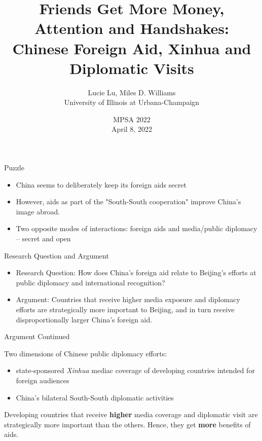 \documentclass{beamer}
\title{Friends Get More Money, Attention and Handshakes:
Chinese Foreign Aid, Xinhua and Diplomatic Visits}
\author{Lucie Lu, Miles D. Williams\\ University of Illinois at Urbana-Champaign}
\date {MPSA 2022 \\ April 8, 2022}
\begin{document}
\maketitle

\begin{frame}{Puzzle}

\begin{itemize}
    \item China seems to deliberately keep its foreign aids secret
    \item However, aids as part of the "South-South cooperation" improve China's image abroad.
    \item Two opposite modes of interactions: foreign aids and media/public diplomacy -- secret and open
\end{itemize}


    
\end{frame}

\begin{frame}{Research Question and Argument}

\begin{itemize}
    \item Research Question: How does China’s foreign aid relate to Beijing’s efforts at public diplomacy and international recognition?

   \item Argument: Countries that receive higher media exposure and diplomacy efforts are
strategically more important to Beijing, and in turn receive disproportionally larger China’s
foreign aid.

\end{itemize}
\end{frame}


\begin{frame}{Argument Continued}

Two dimensions of Chinese public diplomacy efforts:

\begin{itemize}
    \item state-sponsored \textit{Xinhua} mediac coverage of developing countries intended for foreign audiences
    \item China’s bilateral South-South diplomatic activities

\end{itemize}


Developing countries that receive \textbf{higher} media coverage and diplomatic visit are strategically more important than the others. Hence, they get \textbf{more} benefits of aids.
    

\end{frame}
\end{document}
